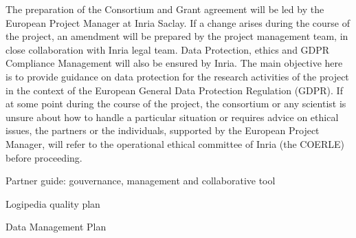 \begin{workpackage}[id=management,type=MGT,wphases=1-48,
  short=Management,
  title=Management,
  lead=Inr,InrRM=34,InnRM=2,SacRM=2,TumRM=2,LieRM=2,BelRM=2,DelRM=2,FauRM=2]
\begin{tasklist}
  \begin{task}[id=legal,title={Legal Management (data, ethics, GDPR)},shorttitle={Legal},
      lead=Inr,InrRM=4,wphases=1-48]
    The preparation of the Consortium and Grant agreement will be led
    by the European Project Manager at Inria Saclay. If a change
    arises during the course of the project, an amendment will be
    prepared by the project management team, in close collaboration
    with Inria legal team.  Data Protection, ethics and GDPR
    Compliance Management will also be ensured by Inria. The main
    objective here is to provide guidance on data protection for the
    research activities of the project in the context of the European
    General Data Protection Regulation (GDPR). If at some point during
    the course of the project, the consortium or any scientist is
    unsure about how to handle a particular situation or requires
    advice on ethical issues, the partners or the individuals,
    supported by the European Project Manager, will refer to the operational ethical
    committee of Inria (the COERLE) before proceeding.
  \end{task}
\end{tasklist}

\begin{wpdelivs}

\begin{wpdeliv}[due=3,id=guide,dissem=PU,nature=R,lead=Inr,task=coordination]{
Partner guide: gouvernance, management and collaborative tool}
\end{wpdeliv}

\begin{wpdeliv}[due=3,id=collab-tools,dissem=PU,nature=R,lead=Inr, task=coordination]{Logipedia quality plan}\end{wpdeliv}



\begin{wpdeliv}[due=4,id=data-plan,dissem=PU,nature=R,lead=Inr, task=coordination]{Data Management Plan}\end{wpdeliv}

\end{wpdelivs}





\end{workpackage}

